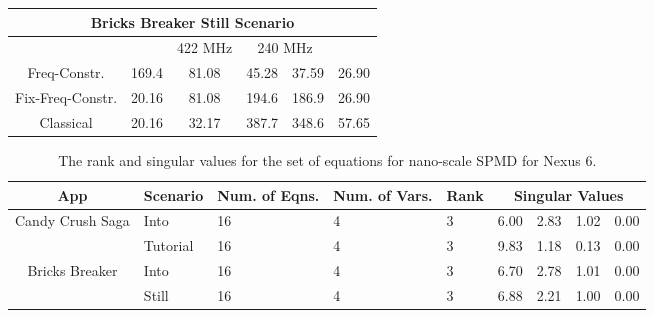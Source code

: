 \begin{table*}[tp]
{\begin{tabular}{|c|c|c|c|c|p{5.4mm}|}
    \multicolumn{6}{|c|}{\textbf{Bricks Breaker Still Scenario}} \\
        \hline
        &  & 422 MHz & \multicolumn{2}{c|}{240 MHz} & \\
        \hline
        Freq-Constr. & 169.4 & 81.08 & 45.28 & 37.59 & 26.90 \\
        Fix-Freq-Constr. & 20.16 & 81.08 & 194.6 & 186.9 & 26.90 \\
        \hline
        Classical & 20.16 & 32.17 & 387.7 & 348.6 & 57.65 \\
        \hline
\end{tabular}
\label{tab:nano_nexus6}
}
\vspace{-0.1in}
\end{table*}

\begin{table*}[tp]
{\footnotesize
    \centering
    \caption{The rank and singular values for the set of equations for nano-scale SPMD for Nexus 6.}
    \vspace{-0.1in}
    \begin{tabular}{|c|p{9mm}|p{4.5mm}|p{4.5mm}|p{4mm}|p{4mm}|p{4mm}|p{4mm}|p{4mm}|}
    \hline
        App & Scenario & Num. of Eqns. & Num. of Vars. & Rank &  \multicolumn{4}{c|}{Singular Values} \\
        \hline
        \multirow{2}{13mm}{Candy Crush Saga} & Into & 16 & 4 & 3 & 6.00  & 2.83  & 1.02  & 0.00 \\
        \cline{2-9}
	     & Tutorial & 16 & 4 & 3 & 9.83  & 1.18  & 0.13  & 0.00 \\
	     \hline
         \multirow{2}{13mm}{Bricks Breaker} & Into & 16 & 4 & 3 & 6.70  & 2.78  & 1.01  & 0.00 \\
         \cline{2-9}
         & Still & 16 & 4 & 3 & 6.88  & 2.21  & 1.00  & 0.00 \\
         \hline
    \end{tabular}
    \label{tab:nano-rank_nexus6}
    \vspace{-0.1in}
}
\end{table*}



















